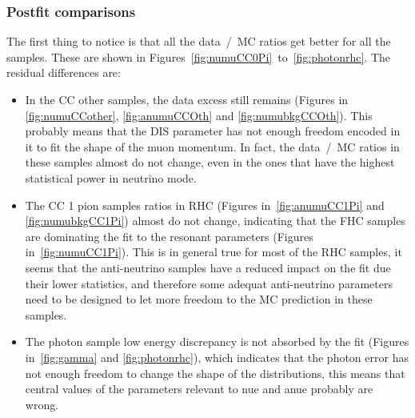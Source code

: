 \subsubsection{Postfit comparisons}
The first thing to notice is that all the data~/~\Gls{MC} ratios get
better for all the samples. These are shown in
Figures~\ref{fig:numuCC0Pi}~to~\ref{fig:photonrhc}. The residual
differences are:
\begin{itemize}[noitemsep,topsep=0pt]
\item In the \Gls{CC} other samples, the data excess still remains
  (Figures in \ref{fig:numuCCother}, \ref{fig:anumuCCOth} and
  \ref{fig:numubkgCCOth}). This probably means that the \Gls{DIS}
  parameter has not enough freedom encoded in it to fit the shape of
  the muon momentum. In fact, the data~/~\Gls{MC} ratios in these
  samples almost do not change, even in the ones that have the highest
  statistical power in neutrino mode.
\item The \Gls{CC} 1 pion samples ratios in \Gls{RHC} (Figures
  in~\ref{fig:anumuCC1Pi} and \ref{fig:numubkgCC1Pi}) almost do not
  change, indicating that the \Gls{FHC} samples are dominating the fit
  to the resonant parameters (Figures in~\ref{fig:numuCC1Pi}). This is
  in general true for most of the \Gls{RHC} samples, it seems that the
  anti-neutrino samples have a reduced impact on the fit due their
  lower statistics, and therefore some adequat anti-neutrino
  parameters need to be designed to let more freedom to the \Gls{MC}
  prediction in these samples.
\item The photon sample low energy discrepancy is not absorbed by the
  fit (Figures in~\ref{fig:gamma} and \ref{fig:photonrhc}), which
  indicates that the photon error has not enough freedom to change the
  shape of the distributions, this means that central values of the
  parameters relevant to \Gls{nue} and \Gls{anue} probably are wrong.
\end{itemize}



